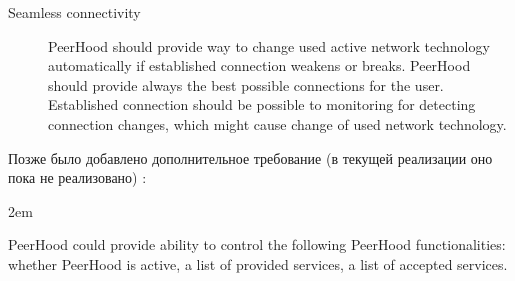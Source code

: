 \begin{description}
	\item[Seamless connectivity] PeerHood should provide way to change used active network 
	technology automatically if established connection weakens or breaks. 
	\Sentence
	PeerHood should provide always the best possible connections for the user. 
	\Sentence
	Established connection should be possible to monitoring for detecting connection changes, which 
	might cause change of used network technology.
\end{description}

Позже было добавлено дополнительное требование (в текущей реализации \PeerHood оно пока 
не реализовано) :
\begin{description}
	\leftskip2em%
	\setlength{\itemsep}{0pt}%
	\setlength{\parsep}{0pt}%
	\item[User control] PeerHood could provide ability to control the following PeerHood 
		functionalities: whether PeerHood is active, a list of provided services, a list of 
		accepted services.
\end{description}


